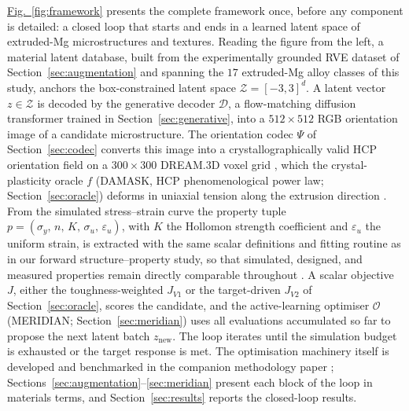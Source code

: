 \documentclass[preprint,12pt]{elsarticle}
\newcommand{\figref}[1]{\hyperref[#1]{Fig.~\ref*{#1}}}
\begin{document}
\figref{fig:framework} presents the complete framework once, before any component is detailed: a closed loop that starts and ends in a learned latent space of extruded-Mg microstructures and textures. Reading the figure from the left, a material latent database, built from the experimentally grounded RVE dataset of Section~\ref{sec:augmentation} and spanning the $17$ extruded-Mg alloy classes of this study, anchors the box-constrained latent space $\mathcal{Z}=[-3,3]^{d}$. A latent vector $z\in\mathcal{Z}$ is decoded by the generative decoder $\mathcal{D}$, a flow-matching diffusion transformer trained in Section~\ref{sec:generative}, into a $512\times512$ RGB orientation image of a candidate microstructure. The orientation codec $\Psi$ of Section~\ref{sec:codec} converts this image into a crystallographically valid HCP orientation field on a $300\times300$ DREAM.3D voxel grid \cite{groeber2014}, which the crystal-plasticity oracle $f$ (DAMASK, HCP phenomenological power law; Section~\ref{sec:oracle}) deforms in uniaxial tension along the extrusion direction \cite{Roters-DAMASK-2019}. From the simulated stress--strain curve the property tuple $p=(\sigma_y,\, n,\, K,\, \sigma_u,\, \varepsilon_u)$, with $K$ the Hollomon strength coefficient and $\varepsilon_u$ the uniform strain, is extracted with the same scalar definitions and fitting routine as in our forward structure--property study, so that simulated, designed, and measured properties remain directly comparable throughout \cite{Guru2025}. A scalar objective $J$, either the toughness-weighted $J_{V1}$ or the target-driven $J_{V2}$ of Section~\ref{sec:oracle}, scores the candidate, and the active-learning optimiser $\mathcal{O}$ (MERIDIAN; Section~\ref{sec:meridian}) uses all evaluations accumulated so far to propose the next latent batch $z_{\mathrm{new}}$. The loop iterates until the simulation budget is exhausted or the target response is met. The optimisation machinery itself is developed and benchmarked in the companion methodology paper {\color{red}\cite{CoPiLOT2026}}; Sections~\ref{sec:augmentation}--\ref{sec:meridian} present each block of the loop in materials terms, and Section~\ref{sec:results} reports the closed-loop results.
\end{document}
